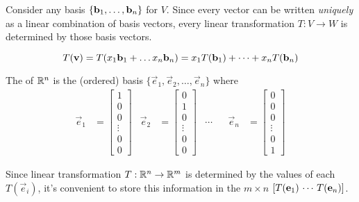 \begin{applicationActivities}{1}{17}
\begin{fact}
Consider any basis \(\{\mathbf b_1,\dots,\mathbf b_n\}\) for $V$.  Since every vector can be written \textit{uniquely} as a linear combination of basis vectors, every linear transformation $T:V \rightarrow W$ is determined by those basis vectors.

\[
  T(\mathbf v)=T(x_1\mathbf b_1+\dots x_n\mathbf b_n)=
  x_1T(\mathbf b_1)+\dots+x_nT(\mathbf b_n)
\]
\end{fact}

\begin{definition}
The  of $\mathbb{R}^n$ is the (ordered) basis $\{\vec{e}_1, \vec{e}_2, \ldots, \vec{e}_n\}$ where
\begin{align*}
\vec{e}_1 &= \begin{bmatrix} 1 \\ 0 \\ 0 \\\vdots \\ 0 \\ 0 \end{bmatrix}  &
\vec{e}_2 &= \begin{bmatrix} 0 \\ 1 \\ 0 \\\vdots \\ 0 \\ 0 \end{bmatrix}  & \cdots  & &
\vec{e}_n &= \begin{bmatrix} 0 \\ 0 \\ 0 \\\vdots \\ 0 \\ 1 \end{bmatrix}
\end{align*}

Since linear transformation \(T:\mathbb{R}^n\to\mathbb{R}^m\) is determined by
the values of each \(T(\vec e_i)\), it's convenient to store this
information in the \(m\times n\) 
\([T(\mathbf e_1) \,\cdots\, T(\mathbf e_n)]\).
\end{definition}



\end{applicationActivities}
